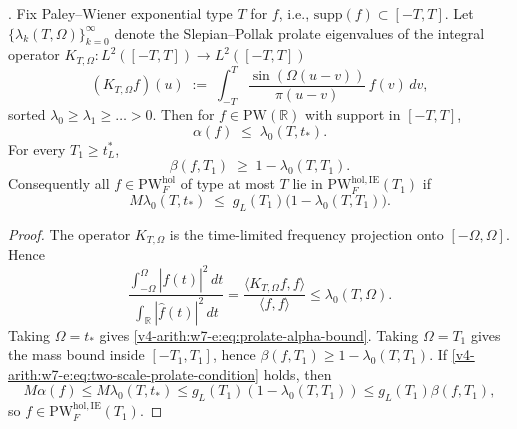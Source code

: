 \begin{theorem}
\label{v4-arith:w7-e:thm:prolate-characterization}
\ClaimStatusProvedHere. Fix Paley--Wiener exponential type \(T\) for
\(f\), i.e., \(\mathrm{supp}(f)\subset[-T,T]\). Let
\(\{\lambda_{k}(T,\Omega)\}_{k=0}^{\infty}\) denote the
Slepian--Pollak prolate eigenvalues of the integral operator
\(K_{T,\Omega}\colon L^{2}([-T,T])\to L^{2}([-T,T])\)
\begin{equation}
\label{v4-arith:w7-e:eq:prolate-operator}
(K_{T,\Omega}f)(u)\;:=\;\int_{-T}^{T}\frac{\sin(\Omega(u-v))}{\pi(u-v)}\,f(v)\,dv,
\end{equation}
sorted \(\lambda_{0}\geq\lambda_{1}\geq\ldots>0\). Then for
\(f\in\mathrm{PW}(\mathbb{R})\) with support in \([-T,T]\),
\begin{equation}
\label{v4-arith:w7-e:eq:prolate-alpha-bound}
\alpha(f)\;\leq\;\lambda_{0}(T,t_{\ast}).
\end{equation}
For every \(T_{1}\geq t_{L}^{\ast}\),
\begin{equation}
\label{v4-arith:w7-e:eq:prolate-beta-bound}
\beta(f,T_{1})\;\geq\;1-\lambda_{0}(T,T_{1}).
\end{equation}
Consequently all \(f\in\mathrm{PW}^{\mathrm{hol}}_{F}\) of type at most
\(T\) lie in \(\mathrm{PW}^{\mathrm{hol},\mathrm{IE}}_{F}(T_{1})\) if
\begin{equation}
\label{v4-arith:w7-e:eq:two-scale-prolate-condition}
M\lambda_{0}(T,t_{\ast})\;\leq\;
g_{L}(T_{1})\bigl(1-\lambda_{0}(T,T_{1})\bigr).
\end{equation}
\end{theorem}

\begin{proof}
The operator \(K_{T,\Omega}\) is the time-limited frequency projection
onto \([-\Omega,\Omega]\). Hence
\[
\frac{\int_{-\Omega}^{\Omega}|\widehat f(t)|^{2}\,dt}
{\int_{\mathbb R}|\widehat f(t)|^{2}\,dt}
=\frac{\langle K_{T,\Omega}f,f\rangle}{\langle f,f\rangle}
\leq \lambda_{0}(T,\Omega).
\]
Taking \(\Omega=t_{\ast}\) gives
\eqref{v4-arith:w7-e:eq:prolate-alpha-bound}. Taking
\(\Omega=T_{1}\) gives the mass bound inside \([-T_{1},T_{1}]\), hence
\(\beta(f,T_{1})\geq1-\lambda_{0}(T,T_{1})\). If
\eqref{v4-arith:w7-e:eq:two-scale-prolate-condition} holds, then
\[
M\alpha(f)\leq M\lambda_{0}(T,t_{\ast})
\leq g_{L}(T_{1})(1-\lambda_{0}(T,T_{1}))
\leq g_{L}(T_{1})\beta(f,T_{1}),
\]
so \(f\in\mathrm{PW}^{\mathrm{hol},\mathrm{IE}}_{F}(T_{1})\).
\end{proof}

